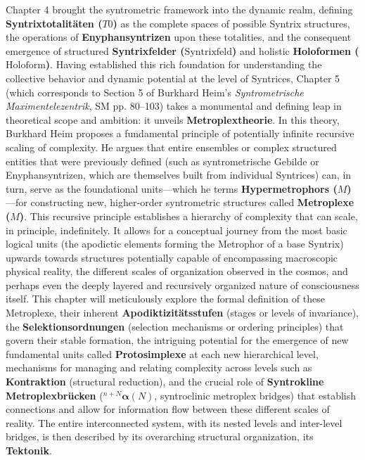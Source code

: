 \documentclass[12pt]{article}
\newcommand{\syntrixtotalitaet}{T0}
\newcommand{\syntrixfeld}{\text{Syntrixfeld}}
\newcommand{\holoform}{\text{Holoform}}
\def\metroplex#1#2{M}%
\newcommand{\hypermetrophor}[1]{%
  \metroplex{#1}{a}%
}
\newcommand{\syntroklinebruecke}[1]{{}^{#1}\bm{\alpha}}
\begin{document}
Chapter 4 brought the syntrometric framework into the dynamic realm, defining \textbf{Syntrixtotalitäten (\(\syntrixtotalitaet\))} as the complete spaces of possible Syntrix structures, the operations of \textbf{Enyphansyntrizen} upon these totalities, and the consequent emergence of structured \textbf{Syntrixfelder (\(\syntrixfeld\))} and holistic \textbf{Holoformen (\(\holoform\))}. Having established this rich foundation for understanding the collective behavior and dynamic potential at the level of Syntrices, Chapter 5 (which corresponds to Section 5 of Burkhard Heim's \textit{Syntrometrische Maximentelezentrik}, SM pp. 80–103) takes a monumental and defining leap in theoretical scope and ambition: it unveils \textbf{Metroplextheorie}. In this theory, Burkhard Heim proposes a fundamental principle of potentially infinite recursive scaling of complexity. He argues that entire ensembles or complex structured entities that were previously defined (such as syntrometrische Gebilde or Enyphansyntrizen, which are themselves built from individual Syntrices) can, in turn, serve as the foundational units—which he terms \textbf{Hypermetrophors (\(\hypermetrophor{n-1}\))}—for constructing new, higher-order syntrometric structures called \textbf{Metroplexe (\(\metroplex{n}{}\))}. This recursive principle establishes a hierarchy of complexity that can scale, in principle, indefinitely. It allows for a conceptual journey from the most basic logical units (the apodictic elements forming the Metrophor of a base Syntrix) upwards towards structures potentially capable of encompassing macroscopic physical reality, the different scales of organization observed in the cosmos, and perhaps even the deeply layered and recursively organized nature of consciousness itself. This chapter will meticulously explore the formal definition of these Metroplexe, their inherent \textbf{Apodiktizitätsstufen} (stages or levels of invariance), the \textbf{Selektionsordnungen} (selection mechanisms or ordering principles) that govern their stable formation, the intriguing potential for the emergence of new fundamental units called \textbf{Protosimplexe} at each new hierarchical level, mechanisms for managing and relating complexity across levels such as \textbf{Kontraktion} (structural reduction), and the crucial role of \textbf{Syntrokline Metroplexbrücken} (\(\syntroklinebruecke{n+N}(N)\), syntroclinic metroplex bridges) that establish connections and allow for information flow between these different scales of reality. The entire interconnected system, with its nested levels and inter-level bridges, is then described by its overarching structural organization, its \textbf{Tektonik}.
\end{document}

